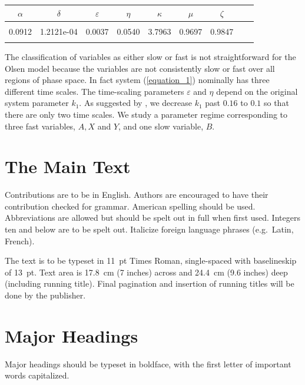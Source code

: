 \documentclass{ws-ijbc}
\begin{document}
\begin{table}[h]
{\begin{tabular}{c  c  c  c  c  c  c  c  c} \\[-2pt]
\toprule
$\alpha$ & $\delta$ & $\varepsilon$ & $\eta$ & $\kappa$ & $\mu$ & $\zeta$ \\[6pt]
\hline\\[-2pt]
0.0912 & 1.2121e-04 & 0.0037 & 0.0540 & 3.7963 & 0.9697 & 0.9847\\[1pt]
\botrule
\end{tabular}}
\end{table}

The classification of variables as either slow or fast is not straightforward for the Olsen model because the variables are not consistently slow or fast over all regions of phase space.  In fact system (\ref{equation_1}) nominally has three different time scales.  The time-scaling parameters $\varepsilon$ and $\eta$ depend on the original system parameter $k_1$.  As suggested by \cite{Rescaling}, we decrease $k_{1}$ past $0.16$ to $0.1$ so that there are only two time scales.  We study a parameter regime corresponding to three fast variables, $A, X$ and $Y$, and one slow variable, $B$.



\section{The Main Text}
\noindent Contributions are to be in English. Authors are
encouraged to have their contribution checked for grammar.
American spelling should be used. Abbreviations are allowed but
should be spelt out in full when first used. Integers ten and
below are to be spelt out. Italicize foreign language phrases
(e.g.~Latin, French).

The text is to be typeset in 11~pt Times \hbox{Roman},
single-spaced with baselineskip of 13~pt. Text area is 17.8~cm (7
inches) across and 24.4~cm (9.6 inches) deep (including running
title). Final pagination and insertion of running titles will be
done by the publisher.

\section{Major Headings}
Major headings should be typeset in boldface, with the first
letter of important words capitalized.
\end{document}
